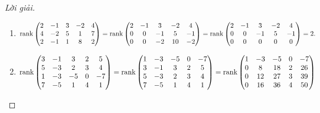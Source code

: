 \documentclass[class=nhvh-linear-algebra,crop=false]{standalone}
\begin{document}
\begin{proof}[Lời giải]
	\begin{enumerate}[label = (\alph*)]
		\item
		      \begingroup{}
		      \allowdisplaybreaks{}
		      \begin{gather*}
			      \text{rank}\begin{pmatrix}
				      2 & -1 & 3 & -2 & 4 \\
				      4 & -2 & 5 & 1  & 7 \\
				      2 & -1 & 1 & 8  & 2
			      \end{pmatrix}
			      =\text{rank}\begin{pmatrix}
				      2 & -1 & 3  & -2 & 4  \\
				      0 & 0  & -1 & 5  & -1 \\
				      0 & 0  & -2 & 10 & -2
			      \end{pmatrix}
			      =\text{rank}\begin{pmatrix}
				      2 & -1 & 3  & -2 & 4  \\
				      0 & 0  & -1 & 5  & -1 \\
				      0 & 0  & 0  & 0  & 0
			      \end{pmatrix}
			      = 2.
		      \end{gather*}
		      \endgroup{}
		\item
		      \begingroup{}
		      \allowdisplaybreaks{}
		      \begin{gather*}
			      \text{rank}\begin{pmatrix}
				      3 & -1 & 3  & 2 & 5  \\
				      5 & -3 & 2  & 3 & 4  \\
				      1 & -3 & -5 & 0 & -7 \\
				      7 & -5 & 1  & 4 & 1
			      \end{pmatrix} =
			      \text{rank}\begin{pmatrix}
				      1 & -3 & -5 & 0 & -7 \\
				      3 & -1 & 3  & 2 & 5  \\
				      5 & -3 & 2  & 3 & 4  \\
				      7 & -5 & 1  & 4 & 1
			      \end{pmatrix} =
			      \text{rank}\begin{pmatrix}
				      1 & -3 & -5 & 0 & -7 \\
				      0 & 8  & 18 & 2 & 26 \\
				      0 & 12 & 27 & 3 & 39 \\
				      0 & 16 & 36 & 4 & 50

\end{pmatrix}
\end{gather*}
\end{enumerate}
\end{proof}
\end{document}
